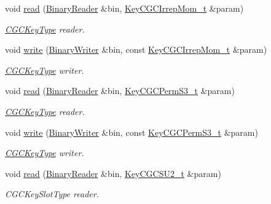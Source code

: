\begin{DoxyCompactItemize}
void \mbox{\hyperlink{namespaceHadron_a0fa916d0de711ad2cf389173ad463f51}{read}} (\mbox{\hyperlink{classADATIO_1_1BinaryReader}{Binary\+Reader}} \&bin, \mbox{\hyperlink{structHadron_1_1KeyCGCIrrepMom__t}{Key\+C\+G\+C\+Irrep\+Mom\+\_\+t}} \&param)
\begin{DoxyCompactList}\small\item\em \mbox{\hyperlink{structHadron_1_1CGCKeyType}{C\+G\+C\+Key\+Type}} reader. \end{DoxyCompactList}\item 
void \mbox{\hyperlink{namespaceHadron_ae48dac33aabaaf829859c63a77a06b8b}{write}} (\mbox{\hyperlink{classADATIO_1_1BinaryWriter}{Binary\+Writer}} \&bin, const \mbox{\hyperlink{structHadron_1_1KeyCGCIrrepMom__t}{Key\+C\+G\+C\+Irrep\+Mom\+\_\+t}} \&param)
\begin{DoxyCompactList}\small\item\em \mbox{\hyperlink{structHadron_1_1CGCKeyType}{C\+G\+C\+Key\+Type}} writer. \end{DoxyCompactList}\item 
void \mbox{\hyperlink{namespaceHadron_ad884472dd0b4c3567f37f8320b63dee3}{read}} (\mbox{\hyperlink{classADATIO_1_1BinaryReader}{Binary\+Reader}} \&bin, \mbox{\hyperlink{structHadron_1_1KeyCGCPermS3__t}{Key\+C\+G\+C\+Perm\+S3\+\_\+t}} \&param)
\begin{DoxyCompactList}\small\item\em \mbox{\hyperlink{structHadron_1_1CGCKeyType}{C\+G\+C\+Key\+Type}} reader. \end{DoxyCompactList}\item 
void \mbox{\hyperlink{namespaceHadron_a4073084eccc97c67b860f51e4efd91e0}{write}} (\mbox{\hyperlink{classADATIO_1_1BinaryWriter}{Binary\+Writer}} \&bin, const \mbox{\hyperlink{structHadron_1_1KeyCGCPermS3__t}{Key\+C\+G\+C\+Perm\+S3\+\_\+t}} \&param)
\begin{DoxyCompactList}\small\item\em \mbox{\hyperlink{structHadron_1_1CGCKeyType}{C\+G\+C\+Key\+Type}} writer. \end{DoxyCompactList}\item 
void \mbox{\hyperlink{namespaceHadron_a5f60c1536ae1aac0334573f8a80eb687}{read}} (\mbox{\hyperlink{classADATIO_1_1BinaryReader}{Binary\+Reader}} \&bin, \mbox{\hyperlink{structHadron_1_1KeyCGCSU2__t}{Key\+C\+G\+C\+S\+U2\+\_\+t}} \&param)
\begin{DoxyCompactList}\small\item\em C\+G\+C\+Key\+Slot\+Type reader. \end{DoxyCompactList}\item 

\end{DoxyCompactItemize}
